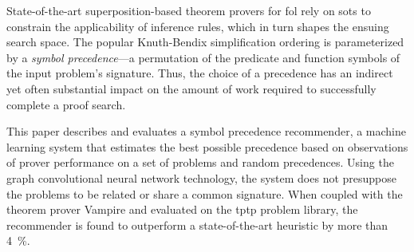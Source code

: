 
State-of-the-art superposition-based theorem provers for \acrlong{fol}
rely on \glspl{sot} to constrain the applicability of inference rules,
which in turn shapes the ensuing search space.
The popular Knuth-Bendix simplification ordering is parameterized by 
a \emph{symbol precedence}---a permutation of the predicate and function symbols
of the input problem's signature.
Thus, the choice of a precedence has an indirect yet often substantial impact
on the amount of work required to successfully complete a proof search.


This paper describes and evaluates a symbol precedence recommender,
a machine learning system that estimates the best possible precedence
based on observations of prover performance on a set of problems and random precedences.
Using the graph convolutional neural network technology,
the system does not presuppose the problems to be related or share a common signature. 
When coupled with the theorem prover Vampire and evaluated on the \acrshort{tptp} problem library,
the recommender is found to outperform a state-of-the-art heuristic by more than \SI{4}{\percent}.




